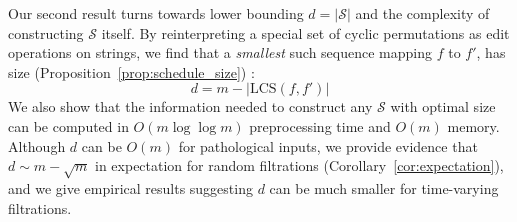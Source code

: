 \documentclass[sn-mathphys]{sn-jnl}
\begin{document}
Our second result turns towards lower bounding $d = \lvert \mathcal{S} \rvert$ and the complexity of constructing $\mathcal{S}$ itself. 
By reinterpreting a special set of cyclic permutations as edit operations on strings, we find that a  \emph{smallest} such sequence mapping $f $ to $  f'$, has size  (Proposition~\ref{prop:schedule_size}) : 
\begin{equation}
	d = m - \lvert \mathrm{LCS}(f, f') \rvert 
\end{equation}
We also show that the information needed to construct any $\mathcal{S}$ with optimal size can be computed in $O(m \log \log m)$ preprocessing time and $O(m)$ memory. Although $d$  can be $O(m)$ for pathological inputs, we provide evidence  that $d \sim m - \sqrt{m}$ in expectation for random filtrations   (Corollary~\ref{cor:expectation}), and we give empirical results suggesting $d$  can be much smaller for time-varying filtrations. 
% 
\end{document}
